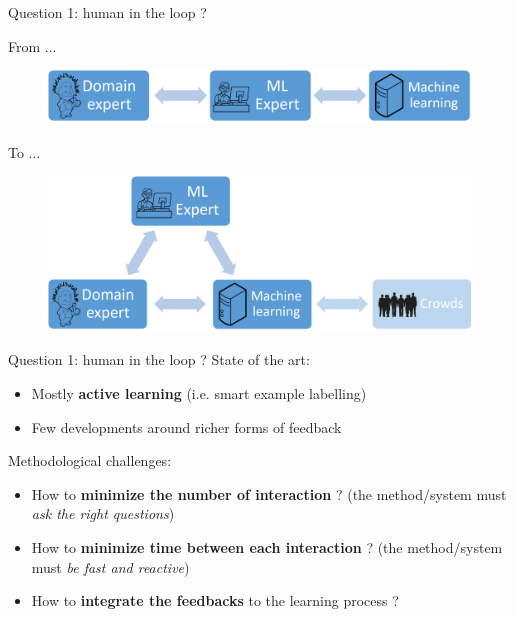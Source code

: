 \documentclass{beamer}
\begin{document}
\begin{frame}{Question 1: human in the loop ?}
	
	From ... 
	
	\begin{figure}[h]
		\includegraphics[scale=0.25]{images/without_expert.png}
	\end{figure}
	
	To ... 
	
	\begin{figure}
		\includegraphics[scale=0.25]{images/with_expert_and_crowd.png}
	\end{figure}	
\end{frame}

\begin{frame}{Question 1: human in the loop ?}
	State of the art:
	\begin{itemize}
		\item Mostly \textbf{active learning} (i.e. smart example labelling)
		\item Few developments around richer forms of feedback
	\end{itemize}		
	\vfill
	Methodological challenges:
	\begin{itemize}
		\item How to \textbf{minimize the number of interaction} ? {\small(the method/system must \textit{ask the right questions})}
		\item How to \textbf{minimize time between each interaction} ? {\small(the method/system must \textit{be fast and reactive})}
		\item How to \textbf{integrate the feedbacks} to the learning process ?
	\end{itemize}

\end{frame}
\end{document}
